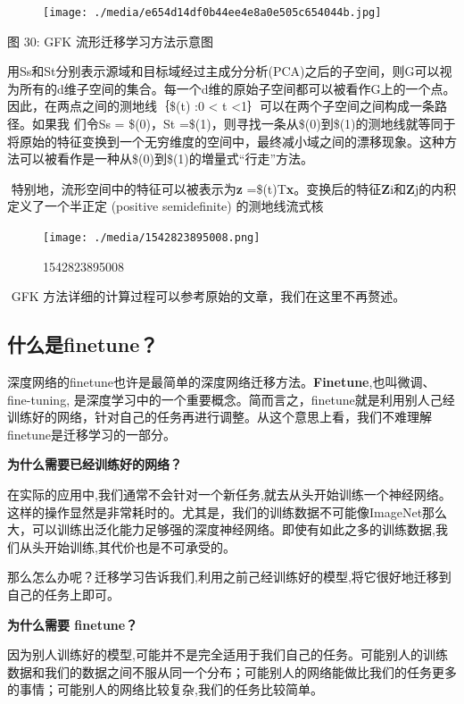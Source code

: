 \begin{figure}
\centering
\texttt{[image: ./media/e654d14df0b44ee4e8a0e505c654044b.jpg]}
\caption{}
\end{figure}

图 30: GFK 流形迁移学习方法示意图

​
用Ss和St分别表示源域和目标域经过主成分分析(PCA)之后的子空间，则G可以视为所有的d维子空间的集合。每一个d维的原始子空间都可以被看作G上的一个点。因此，在两点之间的测地线｛\$(t)
:0 \textless{} t \textless{}1｝可以在两个子空间之间构成一条路径。如果我
们令Ss = \$(0)，St
=\$(1)，则寻找一条从\$(0)到\$(1)的测地线就等同于将原始的特征变换到一个无穷维度的空间中，最终减小域之间的漂移现象。这种方法可以被看作是一种从\$(0)到\$(1)的増量式``行走''方法。

​ 特别地，流形空间中的特征可以被表示为\textbf{z}
=\$(t)T\textbf{x}。变换后的特征\textbf{Z}i和\textbf{Z}j的内积定义了一个半正定
(positive semidefinite) 的测地线流式核

\begin{figure}
\centering
\texttt{[image: ./media/1542823895008.png]}
\caption{1542823895008}
\end{figure}

​ GFK 方法详细的计算过程可以参考原始的文章，我们在这里不再赘述。

\subsection{什么是finetune？}\label{ux4ec0ux4e48ux662ffinetune}

​
深度网络的finetune也许是最简单的深度网络迁移方法。\textbf{Finetune},也叫微调、fine-tuning,
是深度学习中的一个重要概念。简而言之，finetune就是利用别人己经训练好的网络，针对自己的任务再进行调整。从这个意思上看，我们不难理解finetune是迁移学习的一部分。

\textbf{为什么需要已经训练好的网络？}

​
在实际的应用中,我们通常不会针对一个新任务,就去从头开始训练一个神经网络。这样的操作显然是非常耗时的。尤其是，我们的训练数据不可能像ImageNet那么大，可以训练出泛化能力足够强的深度神经网络。即使有如此之多的训练数据,我们从头开始训练,其代价也是不可承受的。

​
那么怎么办呢？迁移学习告诉我们,利用之前己经训练好的模型,将它很好地迁移到自己的任务上即可。

\textbf{为什么需要 finetune？}

​
因为别人训练好的模型,可能并不是完全适用于我们自己的任务。可能别人的训练数据和我们的数据之间不服从同一个分布；可能别人的网络能做比我们的任务更多的事情；可能别人的网络比较复杂,我们的任务比较简单。

